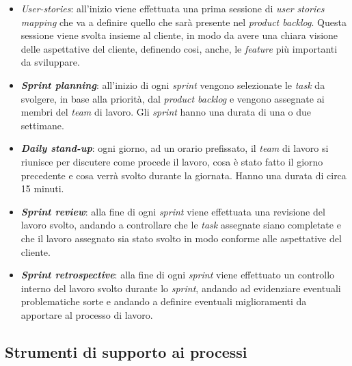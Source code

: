 \begin{itemize}
    \item \textit{\gls{User-stories}}: all'inizio viene effettuata una prima sessione di \textit{user stories mapping} che va a definire quello che sarà presente nel \textit{product backlog}. Questa sessione viene svolta insieme al cliente, in modo da avere una chiara visione delle aspettative del cliente, definendo cosi, anche, le \textit{feature} più importanti da sviluppare.
    \item \textbf{\textit{Sprint planning}}: all'inizio di ogni \textit{sprint} vengono selezionate le \textit{task} da svolgere, in base alla priorità, dal \textit{product backlog} e vengono assegnate ai membri del \textit{team} di lavoro. Gli \textit{sprint} hanno una durata di una o due settimane.
    \item \textbf{\textit{Daily stand-up}}: ogni giorno, ad un orario prefissato, il \textit{team} di lavoro si riunisce per discutere come procede il lavoro, cosa è stato fatto il giorno precedente e cosa verrà svolto durante la giornata. Hanno una durata di circa 15 minuti.
    \item \textbf{\textit{Sprint review}}: alla fine di ogni \textit{sprint} viene effettuata una revisione del lavoro svolto, andando a controllare che le \textit{task} assegnate siano completate e che il lavoro assegnato sia stato svolto in modo conforme alle aspettative del cliente.
    \item \textbf{\textit{Sprint retrospective}}: alla fine di ogni \textit{sprint} viene effettuato un controllo interno del lavoro svolto durante lo \textit{sprint}, andando ad evidenziare eventuali problematiche sorte e andando a definire eventuali miglioramenti da apportare al processo di lavoro.
\end{itemize}
\subsection{Strumenti di supporto ai processi}
